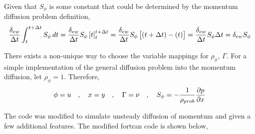 \documentclass[class=report, 12pt, crop=false]{standalone}
\begin{document}
\begin{center}
Given that $S_{\phi}$ is some constant that could be determined by the momentum diffusion problem definition,
$$\frac{\delta_{ew}}{\Delta t}\int^{t+\Delta t}_{t} S_\phi\,dt = \frac{\delta_{ew}}{\Delta t} S_\phi\left[t\right]^{t+\Delta t}_{t} = \frac{\delta_{ew}}{\Delta t} S_\phi\left[(t+\Delta t) - (t)\right] = \frac{\delta_{ew}}{\Delta t} S_\phi\Delta t = \delta_{ew} S_\phi$$

There exists a non-unique way to choose the variable mappings for $\rho_{\phi}$, $\Gamma$. For a simple implementation of the general diffusion problem into the momentum diffusion, let $\rho_{\phi} = 1$. Therefore,
$$\phi = u \quad,\quad x = y \quad,\quad \Gamma = \nu \quad,\quad S_\phi = -\frac{1}{\rho_{prob}}\frac{\partial p}{\partial x}$$


The code was modified to simulate unsteady diffusion of momentum and given a few additional features. The modified fortran code is shown below,


\end{center}
\end{document}
